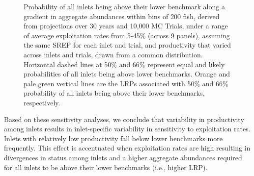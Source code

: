 \documentclass[11pt]{book}
\begin{document}
\begin{figure}[htb]

{\centering {} 

}

\caption{Probability of all inlets being above their lower benchmark along a gradient in aggregate abundances within bins of 200 fish, derived from projections over 30 years and 10,000 MC Trials, under a range of average exploitation rates from 5-45\% (across 9 panels), assuming the same SREP for each inlet and trial, and productivity that varied across inlets and trials, drawn from a common distribution. Horizontal dashed lines at 50\% and 66\% represent equal and likely probabilities of all inlets being above lower benchmarks. Orange and pale green vertical lines are the LRPs associated with 50\% and 66\% probability of all inlets being above their lower benchmarks, respectively. }\label{fig:chinook-ProjLRPs-SameSREP}
\end{figure}
\linebreak

Based on these sensitivity analyses, we conclude that variability in productivity among inlets results in inlet-specific variability in sensitivity to exploitation rates. Inlets with relatively low productivity fall below lower benchmarks more frequently. This effect is accentuated when exploitation rates are high resulting in divergences in status among inlets and a higher aggregate abundances required for all inlets to be above their lower benchmarks (i.e., higher LRP).
\end{document}
